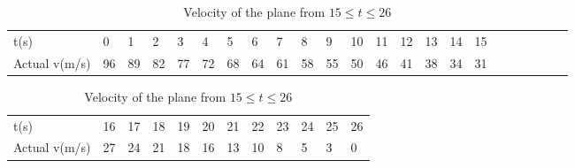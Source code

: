 \begin{flushleft}
\begin{table}[h]
\centering
    \begin{tabular}{|l|l|l|l|l|l|l|l|l|l|l|l|l|l|l|l|l|l|l|l|l|l|l|}
        \hline
        t(s) & 0 & 1 & 2 & 3 & 4 & 5 & 6 & 7 & 8 & 9 & 10 & 11 & 12 & 13 & 14 & 15\\ \cline{1-17} 
        Actual v(m/s) & 96 & 89 & 82 & 77 & 72 & 68 & 64 & 61 & 58 & 55 & 50 & 46 & 41 & 38 & 34 & 31 \\ \cline{1-17}
    \end{tabular}
    \caption{Velocity of the plane from $ 0 \leq t \leq 15$}
    \vspace{0.5cm}
    
    \begin{tabular}{|l|l|l|l|l|l|l|l|l|l|l|l|}
        \hline
        t(s) & 16 & 17 & 18 & 19 & 20 & 21 & 22 & 23 & 24 & 25 & 26 \\ \cline{1-12}
        Actual v(m/s) & 27 & 24 & 21  & 18 & 16 & 13 & 10 & 8 & 5 & 3 & 0 \\ \cline{1-12}
    \end{tabular}
    \caption{Velocity of the plane from $ 15 \leq t \leq 26$}
\end{table}
\end{flushleft}